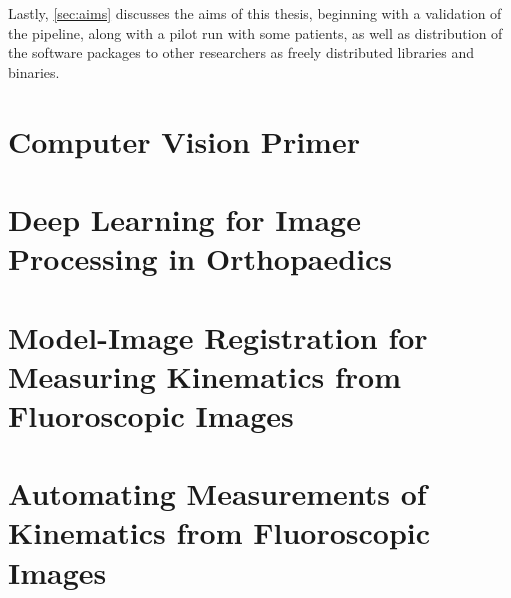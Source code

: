 Lastly, \cref{sec:aims} discusses the aims of this thesis, beginning with a validation of the pipeline, along with a pilot run with some patients, as well as distribution of the software packages to other researchers as freely distributed libraries and binaries.

\section{Computer Vision Primer}
\label{sec:cv-primer}


\section{Deep Learning for Image Processing in Orthopaedics}
\label{sec:deep-learning}


\section{Model-Image Registration for Measuring Kinematics from Fluoroscopic Images}
\label{sec:model-image-registration}


\section{Automating Measurements of Kinematics from Fluoroscopic Images}
\label{sec:autonomous-kinematics}


